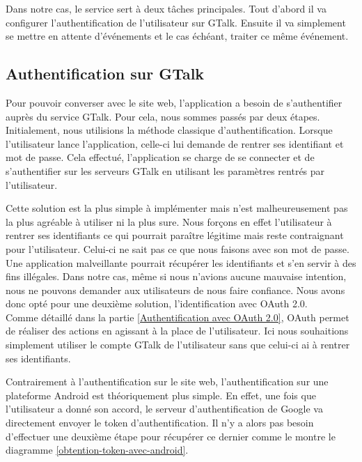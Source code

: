 Dans notre cas, le service sert à deux tâches principales. Tout d'abord il va configurer l'authentification
de l'utilisateur sur GTalk. Ensuite il va simplement se mettre en attente d'événements et le cas échéant, 
traiter ce même événement.



\subsection{Authentification sur GTalk}

Pour pouvoir converser avec le site web, l'application a besoin de s'authentifier auprès du service
GTalk. Pour cela, nous sommes passés par deux étapes. 
\\


Initialement, nous utilisions la méthode classique d'authentification. Lorsque l'utilisateur lance 
l'application, celle-ci lui demande de rentrer ses identifiant et mot de passe. Cela effectué, 
l'application se charge de se connecter et de s'authentifier sur les serveurs GTalk en utilisant les
paramètres rentrés par l'utilisateur.

Cette solution est la plus simple à implémenter mais n'est malheureusement pas la plus agréable
à utiliser ni la plus sure. Nous forçons en effet l'utilisateur à rentrer ses identifiants ce qui 
pourrait paraître légitime mais reste contraignant pour l'utilisateur. Celui-ci ne sait pas ce que 
nous faisons avec son mot de passe. Une application malveillante pourrait récupérer les identifiants
et s'en servir à des fins illégales. Dans notre cas, même si nous n'avions aucune mauvaise intention,
nous ne pouvons demander aux utilisateurs de nous faire confiance. Nous avons donc opté pour une 
deuxième solution, l'identification avec OAuth 2.0.
\\


Comme détaillé dans la partie \ref{Authentification avec OAuth 2.0}, OAuth permet de réaliser des actions en agissant à la place de l'utilisateur. 
Ici nous souhaitions simplement utiliser le compte GTalk de l'utilisateur sans que celui-ci ai à rentrer
ses identifiants. 

Contrairement à l'authentification sur le site web, l'authentification sur une plateforme Android est
théoriquement plus simple. En effet, une fois que l'utilisateur a donné son accord, le serveur 
d'authentification de Google va directement envoyer le token d'authentification. Il n'y a alors pas 
besoin d'effectuer une deuxième étape pour récupérer ce dernier comme le montre le diagramme 
\ref{obtention-token-avec-android}.

